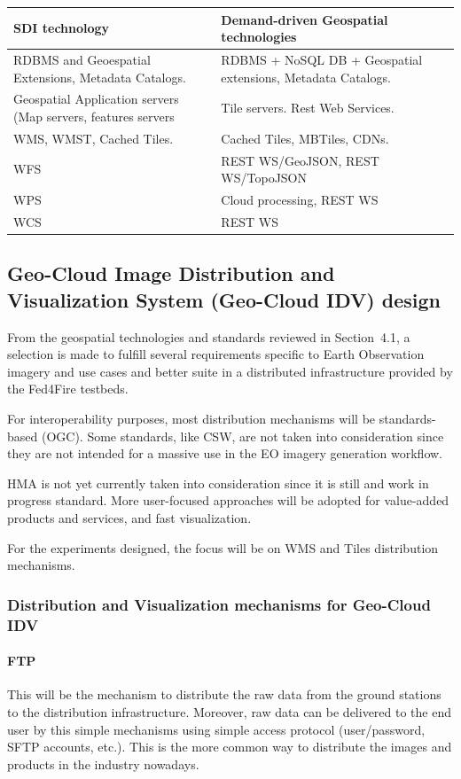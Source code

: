 \documentclass[a4paper]{article}
\begin{document}
\begin{flushleft}
\tablehead{}
\begin{supertabular}{|m{3.0260599in}|m{3.2607598in}|}
\hline
\bfseries SDI technology &
\bfseries Demand-driven Geospatial technologies\\\hline
RDBMS and Geoespatial Extensions, Metadata Catalogs. &
RDBMS + NoSQL DB + Geospatial extensions, Metadata Catalogs.\\\hline
Geospatial Application servers (Map servers, features servers &
Tile servers. Rest Web Services.\\\hline
WMS, WMST, Cached Tiles. &
Cached Tiles, MBTiles, CDNs.\\\hline
WFS &
REST WS/GeoJSON, REST WS/TopoJSON\\\hline
WPS &
Cloud processing, REST WS\\\hline
WCS &
REST WS\\\hline
\end{supertabular}
\end{flushleft}

\bigskip

\subsection[Geo{}-Cloud Image Distribution and Visualization System
(Geo{}-Cloud IDV) design]{Geo-Cloud Image Distribution and
Visualization System (Geo-Cloud IDV) design}
\hypertarget{Toc381777205}{}From the geospatial technologies and
standards reviewed in Section\ 4.1, a selection is made to fulfill
several requirements specific to Earth Observation imagery and use
cases and better suite in a distributed infrastructure provided by the
Fed4Fire testbeds.\ 

For interoperability purposes, most distribution mechanisms will be
standards-based (OGC). Some standards, like CSW, are not taken into
consideration since they are not intended for a massive use in the EO
imagery generation workflow.\ 

HMA is not yet currently taken into consideration since it is still and
work in progress standard. More user-focused approaches will be adopted
for value-added products and services, and fast visualization.

For the experiments designed, the focus will be on WMS and Tiles
distribution mechanisms.

\subsubsection[Distribution and Visualization mechanisms for Geo{}-Cloud
IDV]{Distribution and Visualization mechanisms for Geo-Cloud IDV}
\hypertarget{Toc381777206}{}\paragraph[FTP]{FTP}
This will be the mechanism to distribute the raw data from the ground
stations to the distribution infrastructure. Moreover, raw data can be
delivered to the end user by this simple mechanisms using simple access
protocol (user/password, SFTP accounts, etc.). This is the more common
way to distribute the images and products in the industry nowadays.\ 
\end{document}
